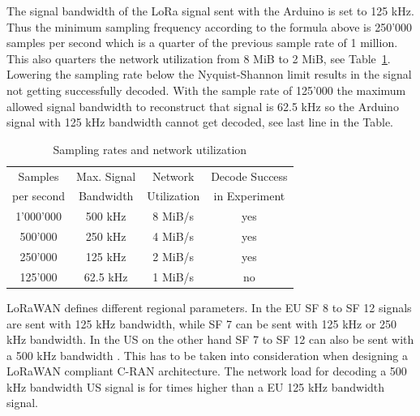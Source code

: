 The signal bandwidth of the LoRa signal sent with the Arduino is set to 125 kHz. Thus the minimum sampling frequency according to the formula above
is 250'000 samples per second which is a quarter of the previous sample rate of 1 million. This also quarters the network utilization from 8 MiB to 2 MiB, see Table~\ref{tabl:samprates}.
Lowering the sampling rate below the Nyquist-Shannon limit results in the signal not getting successfully decoded.
With the sample rate of 125'000 the maximum allowed signal bandwidth to reconstruct that signal is 62.5 kHz so the Arduino signal with 125 kHz bandwidth 
cannot get decoded, see last line in the Table.

\begin{table}[h]
    \centering
    \setlength{\tabcolsep}{22pt}
    \renewcommand{\arraystretch}{1.2}
    \begin{tabular}{cccc}
        \toprule
        Samples & Max. Signal & Network & Decode Success \\
        per second & Bandwidth & Utilization & in Experiment\\
        \midrule
        1'000'000  &500 kHz & 8 MiB/s    &yes\\
        500'000  &250 kHz & 4 MiB/s    &yes\\
        250'000&  125 kHz&  2 MiB/s  & yes\\
        125'000 & 62.5 kHz & 1 MiB/s & no\\
        \bottomrule
       \end{tabular}
\caption{Sampling rates and network utilization}
\label{tabl:samprates}
\end{table}

LoRaWAN defines different regional parameters. In the EU SF 8 to SF 12 signals are sent with 125 kHz bandwidth, while SF 7
can be sent with 125 kHz or 250 kHz bandwidth. In the US on the other hand SF 7 to SF 12 can also be sent with
a 500 kHz bandwidth \cite{lora_wan_reg_params}.
This has to be taken into consideration when designing a LoRaWAN compliant C-RAN architecture.
The network load for decoding a 500 kHz bandwidth US signal is for times higher than a EU 125 kHz bandwidth signal.

